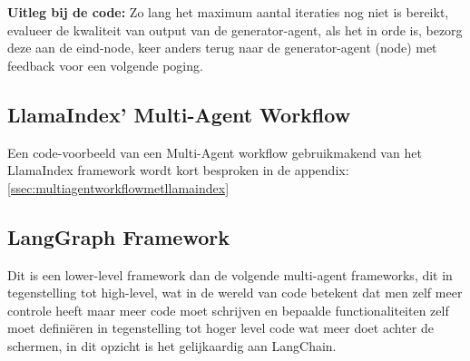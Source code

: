 \textbf{Uitleg bij de code:} Zo lang het maximum aantal iteraties nog niet is bereikt, evalueer de kwaliteit van output van de generator-agent, als het in orde is, bezorg deze aan de eind-node, keer anders terug naar de generator-agent (node) met feedback voor een volgende poging.

\subsection{LlamaIndex' Multi-Agent Workflow}
\label{ssec:llamaindexmulti-agentworkflow}
Een code-voorbeeld van een Multi-Agent workflow gebruikmakend van het LlamaIndex framework wordt kort besproken in de appendix: \ref{ssec:multiagentworkflowmetllamaindex}

\subsection{LangGraph Framework}
\label{ssec:langgraphframework}
Dit is een lower-level framework dan de volgende multi-agent frameworks, dit in tegenstelling tot high-level, wat in de wereld van code betekent dat men zelf meer controle heeft maar meer code moet schrijven en bepaalde functionaliteiten zelf moet definiëren in tegenstelling tot hoger level code wat meer doet achter de schermen, in dit opzicht is het gelijkaardig aan LangChain. \\

